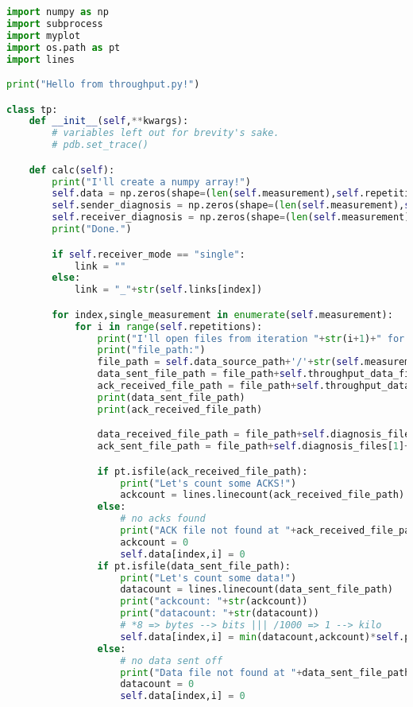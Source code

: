 \begin{lstlisting}[language=Python,caption=sniffer.py]
import numpy as np
import subprocess
import myplot
import os.path as pt
import lines

print("Hello from throughput.py!")

class tp:
    def __init__(self,**kwargs):
        # variables left out for brevity's sake.
        # pdb.set_trace()

    def calc(self):
        print("I'll create a numpy array!")
        self.data = np.zeros(shape=(len(self.measurement),self.repetitions))
        self.sender_diagnosis = np.zeros(shape=(len(self.measurement),self.repetitions))
        self.receiver_diagnosis = np.zeros(shape=(len(self.measurement),self.repetitions))
        print("Done.")

        if self.receiver_mode == "single":
            link = ""
        else:
            link = "_"+str(self.links[index])

        for index,single_measurement in enumerate(self.measurement):
            for i in range(self.repetitions):
                print("I'll open files from iteration "+str(i+1)+" for you!")
                print("file_path:")
                file_path = self.data_source_path+'/'+str(self.measurement[index])+'/'+str(i+1)+'/'
                data_sent_file_path = file_path+self.throughput_data_files[0]+link+".txt"
                ack_received_file_path = file_path+self.throughput_data_files[1]+"_"+str(self.links[index])+".txt"
                print(data_sent_file_path)
                print(ack_received_file_path)

                data_received_file_path = file_path+self.diagnosis_files[0]+link+".txt"
                ack_sent_file_path = file_path+self.diagnosis_files[1]+link+".txt"

                if pt.isfile(ack_received_file_path):
                    print("Let's count some ACKS!")
                    ackcount = lines.linecount(ack_received_file_path)
                else:
                    # no acks found
                    print("ACK file not found at "+ack_received_file_path+".")
                    ackcount = 0
                    self.data[index,i] = 0
                if pt.isfile(data_sent_file_path):
                    print("Let's count some data!")
                    datacount = lines.linecount(data_sent_file_path)
                    print("ackcount: "+str(ackcount))
                    print("datacount: "+str(datacount))
                    # *8 => bytes --> bits ||| /1000 => 1 --> kilo
                    self.data[index,i] = min(datacount,ackcount)*self.packet_size/self.timer*8/1000
                else:
                    # no data sent off
                    print("Data file not found at "+data_sent_file_path+".")
                    datacount = 0
                    self.data[index,i] = 0


\end{lstlisting}
